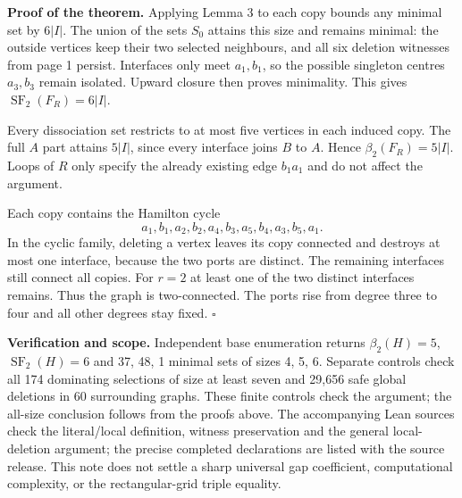 \documentclass[11pt]{article}
\newcommand{\SF}{\operatorname{SF}_2}
\newcommand{\bb}{\beta_2}
\begin{document}
\textbf{Proof of the theorem.} Applying Lemma 3 to each copy bounds any
minimal set by $6|I|$. The union of the sets $S_0$ attains this size and
remains minimal: the outside vertices keep their two selected neighbours,
and all six deletion witnesses from page 1 persist. Interfaces only meet
$a_1,b_1$, so the possible singleton centres $a_3,b_3$ remain isolated.
Upward closure then proves minimality. This gives $\SF(F_R)=6|I|$.

Every dissociation set restricts to at most five vertices in each induced
copy. The full $A$ part attains $5|I|$, since every interface joins $B$ to
$A$. Hence $\bb(F_R)=5|I|$. Loops of $R$ only specify the already existing
edge $b_1a_1$ and do not affect the argument.

Each copy contains the Hamilton cycle
\[
 a_1,b_1,a_2,b_2,a_4,b_3,a_5,b_4,a_3,b_5,a_1.
\]
In the cyclic family, deleting a vertex leaves its copy connected and
destroys at most one interface, because the two ports are distinct.
The remaining interfaces still connect all copies. For $r=2$ at least one
of the two distinct interfaces remains. Thus the graph is two-connected.
The ports rise from degree three to four and all other degrees stay fixed.
\hfill$\square$

\textbf{Verification and scope.} Independent base enumeration returns
$\bb(H)=5$, $\SF(H)=6$ and 37, 48, 1 minimal sets of sizes 4, 5, 6.
Separate controls check all 174 dominating selections of size at least
seven and 29,656 safe global deletions in 60 surrounding graphs. These
finite controls check the argument; the all-size conclusion follows from
the proofs above. The accompanying Lean sources check the literal/local
definition, witness preservation and the general local-deletion argument;
the precise completed declarations are listed with the source release.
This note does not settle a sharp universal gap coefficient, computational
complexity, or the rectangular-grid triple equality.
\end{document}
